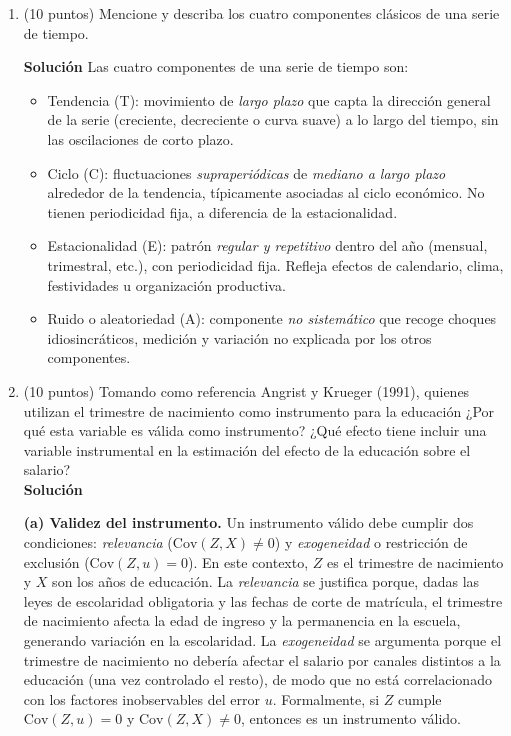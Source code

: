 \documentclass[10pt,a4paper]{article}
\begin{document}
\begin{enumerate}
\item (10 puntos) Mencione y describa los cuatro componentes clásicos de una serie de tiempo.

\textbf{Solución}
Las cuatro componentes de una serie de tiempo son:
\begin{itemize}
    \item Tendencia (T): movimiento de \emph{largo plazo} que capta la dirección general de la serie
  (creciente, decreciente o curva suave) a lo largo del tiempo, sin las oscilaciones de corto plazo.
    \item Ciclo (C): fluctuaciones \emph{supraperiódicas} de \emph{mediano a largo plazo} alrededor de la tendencia,
  típicamente asociadas al ciclo económico. No tienen periodicidad fija, a diferencia de la estacionalidad.
  \item Estacionalidad (E): patrón \emph{regular y repetitivo} dentro del año (mensual, trimestral, etc.),
  con periodicidad fija. Refleja efectos de calendario, clima, festividades u organización productiva.
  \item Ruido o aleatoriedad (A):  componente \emph{no sistemático} que recoge choques idiosincráticos,
  medición y variación no explicada por los otros componentes.

\end{itemize}

\item (10 puntos) Tomando como referencia Angrist y Krueger (1991), quienes utilizan el trimestre de nacimiento como instrumento para la educación ¿Por qué esta variable es válida como instrumento? ¿Qué efecto tiene incluir una variable instrumental en la estimación del efecto de la educación sobre el salario?
\\
\textbf{Solución}

\textbf{(a) Validez del instrumento.}
Un instrumento válido debe cumplir dos condiciones:
\emph{relevancia} (\(\mathrm{Cov}(Z,X)\neq0\)) y \emph{exogeneidad} o restricción de exclusión (\(\mathrm{Cov}(Z,u)=0\)). 
En este contexto, \(Z\) es el trimestre de nacimiento y \(X\) son los años de educación. 
La \emph{relevancia} se justifica porque, dadas las leyes de escolaridad obligatoria y las fechas de corte de matrícula, el trimestre de nacimiento afecta la edad de ingreso y la permanencia en la escuela, generando variación en la escolaridad. 
La \emph{exogeneidad} se argumenta porque el trimestre de nacimiento no debería afectar el salario por canales distintos a la educación (una vez controlado el resto), de modo que no está correlacionado con los factores inobservables del error \(u\). 
Formalmente, si \(Z\) cumple \(\mathrm{Cov}(Z,u)=0\) y \(\mathrm{Cov}(Z,X)\neq 0\), entonces es un instrumento válido. 
\\



\end{enumerate}
\end{document}
